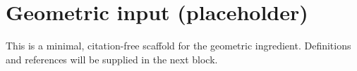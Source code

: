 \section{Geometric input (placeholder)}
\label{sec:geometric}
This is a minimal, citation-free scaffold for the geometric ingredient.
Definitions and references will be supplied in the next block.
